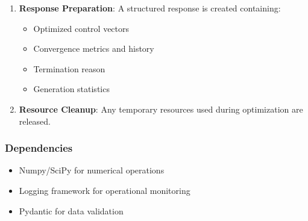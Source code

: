 \begin{enumerate}
\begin{enumerate}
	\item \textbf{Response Preparation}: A structured response is created containing:
	\begin{itemize}
		\item Optimized control vectors
		\item Convergence metrics and history
		\item Termination reason
		\item Generation statistics
	\end{itemize}

	\item \textbf{Resource Cleanup}: Any temporary resources used during optimization are released.
\end{enumerate}

\end{enumerate}

\subsubsection{Dependencies}

\begin{itemize}
	\item Numpy/SciPy for numerical operations
	\item Logging framework for operational monitoring
	\item Pydantic for data validation
\end{itemize}

